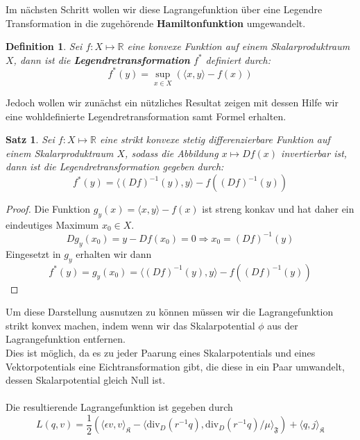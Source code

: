 \documentclass[11pt,a4paper,leqno]{report}
\newtheorem{proposition}{Satz}[chapter]
\newtheorem{definition}[theorem]{Definition}
\numberwithin{equation}{chapter}
\begin{document}
\noindent
Im n\"achsten Schritt wollen wir diese Lagrangefunktion \"uber eine Legendre Transformation in die zugeh\"orende \textbf{Hamiltonfunktion} umgewandelt.
\begin{definition}
	Sei $f:X\mapsto\mathbb{R}$ eine konvexe Funktion auf einem Skalarproduktraum $X$, dann ist die \textbf{Legendretransformation} $f^*$ definiert durch:
	\begin{equation}
		f^*(y) = \sup_{x\in X}(\langle x, y\rangle-f(x))
	\end{equation}
\end{definition}
\noindent
Jedoch wollen wir zun\"achst ein n\"utzliches Resultat zeigen mit dessen Hilfe wir eine wohldefinierte Legendretransformation samt Formel erhalten.
\begin{proposition}
	Sei $f:X\mapsto\mathbb{R}$ eine strikt konvexe stetig differenzierbare Funktion auf einem Skalarproduktraum $X$, sodass die Abbildung $x\mapsto Df(x)$ invertierbar ist, dann ist die Legendretransformation gegeben durch:
	\begin{equation}
		f^*(y) = \langle (Df)^{-1}(y), y\rangle-f((Df)^{-1}(y))
	\end{equation}
\end{proposition}
\begin{proof}
Die Funktion $g_y(x)=\langle x, y\rangle-f(x)$ ist streng konkav und hat daher ein eindeutiges Maximum $x_0\in X$.
\begin{equation*}
	Dg_y(x_0) = y - Df(x_0)=0\Rightarrow x_0 = (Df)^{-1}(y)
\end{equation*}
Eingesetzt in $g_y$ erhalten wir dann
\begin{equation*}
	f^*(y)=g_y(x_0) = \langle (Df)^{-1}(y), y\rangle-f((Df)^{-1}(y))
\end{equation*}
\end{proof}
\noindent
Um diese Darstellung ausnutzen zu k\"onnen m\"ussen wir die Lagrangefunktion strikt konvex machen, indem wenn wir das Skalarpotential $\phi$ aus der Lagrangefunktion entfernen.\\
Dies ist m\"oglich, da es zu jeder Paarung eines Skalarpotentials und eines Vektorpotentials eine Eichtransformation gibt, die diese in ein Paar umwandelt, dessen Skalarpotential gleich Null ist.\\
\\
Die resultierende Lagrangefunktion ist gegeben durch 
\begin{equation}
	L(q, v) =\frac{1}{2}(\langle \epsilon v, v\rangle_\mathfrak{K} - \langle\text{div}_D(r^{-1}q), \text{div}_D(r^{-1}q)/\mu\rangle_\mathfrak{F}) + \langle q, j\rangle_\mathfrak{K}
\end{equation}
\end{document}
